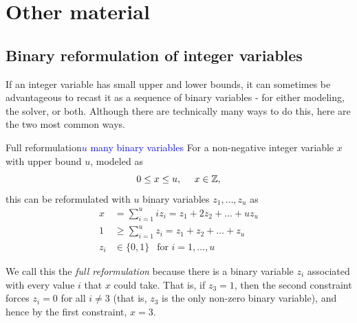 \section{Other material}

\subsection{Binary reformulation of integer variables}
If an integer variable has small upper and lower bounds, it can sometimes be advantageous to recast it as a sequence of binary variables - for either modeling, the solver, or both.   Although there are technically many ways to do this, here are the two most common ways.

\begin{general}{Full reformulation}{\textcolor{blue}{$u$ many binary variables}}
\label{general:full-reformulation}
For a non-negative integer variable $x$ with upper bound $u$, modeled as 
\begin{equation}
0 \leq x \leq u, \ \ \ \ x \in \mathbb{Z},
\end{equation}
this can be reformulated with $u$ binary variables $z_1, \dots, z_u$ as 
\begin{equation}
\begin{split}
x & = \sum_{i=1}^u i z_i = z_1 + 2 z_2 + \dots + u z_u\\
1 & \geq \sum_{i=1}^u z_i = z_1 + z_2 + \dots + z_u\\
z_i & \in \{0,1\} \ \ \text{ for } i=1, \dots, u
\end{split}
\end{equation}
\end{general}
We call this the \emph{full reformulation} because there is a binary variable $z_i$ associated with every value $i$ that $x$ could take.  That is, if $z_3 = 1$, then the second constraint forces $z_i = 0$ for all $i \neq 3$ (that is, $z_3$ is the only non-zero binary variable), and hence by the first constraint, $x = 3$.


